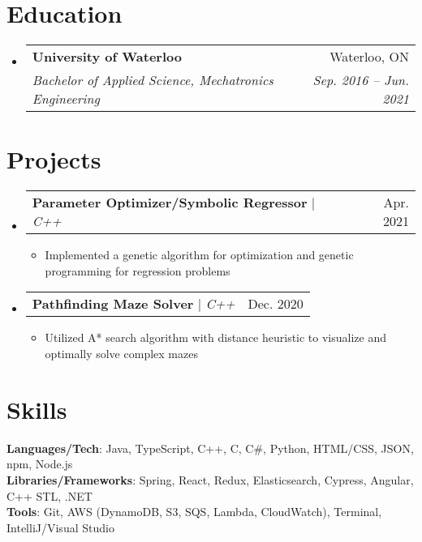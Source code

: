 \documentclass[letterpaper,11pt]{article}
\makeatletter
\newcommand{\resumeItem}[1]{
  \item\small{
    {#1 \vspace{-2pt}}
  }
}
\newcommand{\resumeSubheading}[4]{
  \vspace{-2pt}\item
    \begin{tabular*}{0.97\textwidth}[t]{l@{\extracolsep{\fill}}r}
      \textbf{#1} & #2 \\
      \textit{\small#3} & \textit{\small #4} \\
    \end{tabular*}\vspace{-7pt}
}
\newcommand{\resumeProjectHeading}[2]{
    \item
    \begin{tabular*}{0.97\textwidth}{l@{\extracolsep{\fill}}r}
      \small#1 & #2 \\
    \end{tabular*}\vspace{-7pt}
}
\newcommand{\resumeSubHeadingListStart}{\begin{itemize}[leftmargin=0.15in, label={}]}
\newcommand{\resumeSubHeadingListEnd}{\end{itemize}}
\newcommand{\resumeItemListStart}{\begin{itemize}}
\newcommand{\resumeItemListEnd}{\end{itemize}\vspace{-5pt}}
\makeatother
\begin{document}
\section{Education}
  \resumeSubHeadingListStart
    \resumeSubheading
      {University of Waterloo}{Waterloo, ON}
      {Bachelor of Applied Science, Mechatronics Engineering}{Sep. 2016 -- Jun. 2021}
  \resumeSubHeadingListEnd

\section{Projects}
    \resumeSubHeadingListStart
      \resumeProjectHeading
          {\textbf{Parameter Optimizer/Symbolic Regressor} $|$ \emph{C++}}{Apr. 2021}
          \resumeItemListStart
            \resumeItem{Implemented a genetic algorithm for optimization and genetic programming for regression problems}
          \resumeItemListEnd
      \resumeProjectHeading
          {\textbf{Pathfinding Maze Solver} $|$ \emph{C++}}{Dec. 2020}
          \resumeItemListStart
            \resumeItem{Utilized A* search algorithm with distance heuristic to visualize and optimally solve complex mazes}
          \resumeItemListEnd
    \resumeSubHeadingListEnd

\section{Skills}
 \begin{itemize}[leftmargin=0.15in, label={}]
    \small{\item{
     \textbf{Languages/Tech}{: Java, TypeScript, C++, C, C\#, Python, HTML/CSS, JSON, npm, Node.js} \\
     \textbf{Libraries/Frameworks}{: Spring, React, Redux, Elasticsearch, Cypress, Angular, C++ STL, .NET} \\
     \textbf{Tools}{: Git, AWS (DynamoDB, S3, SQS, Lambda, CloudWatch), Terminal, IntelliJ/Visual Studio} \\
    }}
 \end{itemize}

\end{document}
